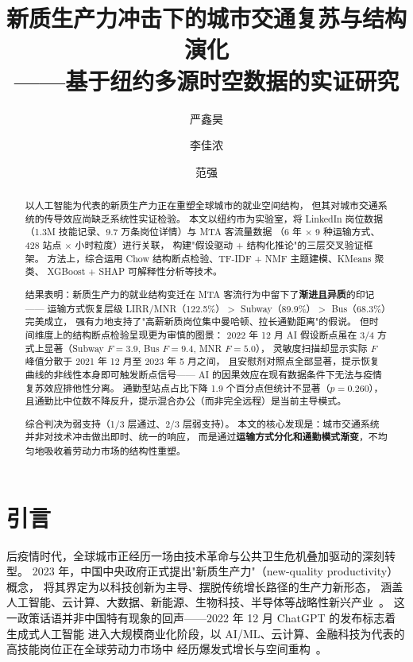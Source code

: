\documentclass[runningheads]{llncs}
\title{新质生产力冲击下的城市交通复苏与结构演化\\
       ——基于纽约多源时空数据的实证研究}
\author{严鑫昊\inst{1} \and 李佳浓\inst{2} \and 范强\inst{3}}
\institute{学号 0251136036 \and 学号 0251136032 \and 学号 0251136018}
\begin{document}
\maketitle

\begin{abstract}
以人工智能为代表的新质生产力正在重塑全球城市的就业空间结构，
但其对城市交通系统的传导效应尚缺乏系统性实证检验。
本文以纽约市为实验室，将 LinkedIn 岗位数据（1.3M 技能记录、9.7 万条岗位详情）与 MTA 客流量数据
（6 年 $\times$ 9 种运输方式、428 站点 $\times$ 小时粒度）进行关联，
构建"假设驱动 + 结构化推论"的三层交叉验证框架。
方法上，综合运用 Chow 结构断点检验、TF-IDF + NMF 主题建模、KMeans 聚类、
XGBoost + SHAP 可解释性分析等技术。

结果表明：新质生产力的就业结构变迁在 MTA 客流行为中留下了\textbf{渐进且异质}的印记——
运输方式恢复层级 LIRR/MNR（122.5\%）$>$ Subway（89.9\%）$>$ Bus（68.3\%）完美成立，
强有力地支持了"高薪新质岗位集中曼哈顿、拉长通勤距离"的假说。
但时间维度上的结构断点检验呈现更为审慎的图景：
2022 年 12 月 AI 假设断点虽在 3/4 方式上显著（Subway $F=3.9$, Bus $F=9.4$, MNR $F=5.0$），
灵敏度扫描却显示实际 $F$ 峰值分散于 2021 年 12 月至 2023 年 5 月之间，
且安慰剂对照点全部显著，提示恢复曲线的非线性本身即可触发断点信号——
AI 的因果效应在现有数据条件下无法与疫情复苏效应排他性分离。
通勤型站点占比下降 1.9 个百分点但统计不显著（$p=0.260$），
且通勤比中位数不降反升，提示混合办公（而非完全远程）是当前主导模式。

综合判决为弱支持（1/3 层通过、2/3 层弱支持）。
本文的核心发现是：城市交通系统并非对技术冲击做出即时、统一的响应，
而是通过\textbf{运输方式分化和通勤模式渐变}，不均匀地吸收着劳动力市场的结构性重塑。
\end{abstract}

\section{引言}

后疫情时代，全球城市正经历一场由技术革命与公共卫生危机叠加驱动的深刻转型。
2023 年，中国中央政府正式提出"新质生产力"（new-quality productivity）概念，
将其界定为以科技创新为主导、摆脱传统增长路径的生产力新形态，
涵盖人工智能、云计算、大数据、新能源、生物科技、半导体等战略性新兴产业~\cite{zhou2023}。
这一政策话语并非中国特有现象的回声——2022 年 12 月 ChatGPT 的发布标志着生成式人工智能
进入大规模商业化阶段，以 AI/ML、云计算、金融科技为代表的高技能岗位正在全球劳动力市场中
经历爆发式增长与空间重构~\cite{brynjolfsson2023,eloundou2023,felten2023}。
\end{document}
